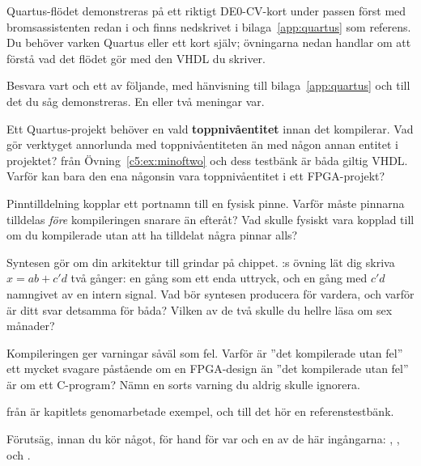 
Quartus-flödet demonstreras på ett riktigt DE0-CV-kort under passen \textemdash{} först med
bromsassistenten redan i  \textemdash{} och finns nedskrivet i
bilaga~\ref{app:quartus} som referens. Du behöver varken Quartus eller ett kort själv; övningarna
nedan handlar om att förstå vad det flödet gör med den VHDL du skriver.

\label{c5:ex:quartus}
Besvara vart och ett av följande, med hänvisning till bilaga~\ref{app:quartus} och till det du såg
demonstreras. En eller två meningar var.

 Ett Quartus-projekt behöver en vald \textbf{toppnivåentitet} innan det kompilerar. Vad
gör verktyget annorlunda med toppnivåentiteten än med någon annan entitet i projektet?
 från Övning~\ref{c5:ex:minoftwo} och dess testbänk är båda giltig VHDL. Varför
kan bara den ena någonsin vara toppnivåentitet i ett FPGA-projekt?

 Pinntilldelning kopplar ett portnamn till en fysisk pinne. Varför måste pinnarna
tilldelas \emph{före} kompileringen snarare än efteråt? Vad skulle  fysiskt vara kopplad
till om du kompilerade  utan att ha tilldelat några pinnar alls?

 Syntesen gör om din arkitektur till grindar på chippet. :s övning
 lät dig skriva $x = ab + c'd$ två gånger: en gång som ett enda uttryck, och en
gång med $c'd$ namngivet av en intern signal. Vad bör syntesen producera för vardera, och varför är
ditt svar detsamma för båda? Vilken av de två skulle du hellre läsa om sex månader?

 Kompileringen ger varningar såväl som fel. Varför är ”det kompilerade utan fel” ett mycket
svagare påstående om en FPGA-design än ”det kompilerade utan fel” är om ett C-program? Nämn en sorts
varning du aldrig skulle ignorera.

\label{c5:ex:parity}
 från  är kapitlets genomarbetade exempel, och till det hör
en referenstestbänk.

 Förutsäg, innan du kör något,  för hand för var och en av de här ingångarna:
, ,  och .

